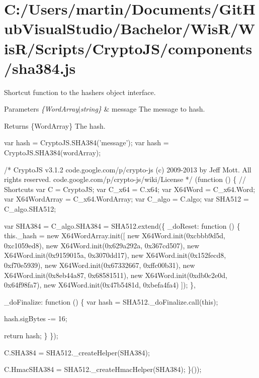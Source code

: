 \hypertarget{_c_1_2_users_2martin_2_documents_2_git_hub_visual_studio_2_bachelor_2_wis_r_2_wis_r_2_scripts_2_4702e0369f887b57f6c243281e391e4a}{}\section{C\+:/\+Users/martin/\+Documents/\+Git\+Hub\+Visual\+Studio/\+Bachelor/\+Wis\+R/\+Wis\+R/\+Scripts/\+Crypto\+J\+S/components/sha384.\+js}
Shortcut function to the hasher\textquotesingle{}s object interface.


\begin{DoxyParams}{Parameters}
{\em \{\+Word\+Array$\vert$string\}} & message The message to hash.\\
\hline
\end{DoxyParams}
\begin{DoxyReturn}{Returns}
\{Word\+Array\} The hash.
\end{DoxyReturn}
\begin{DoxyVerb}var hash = CryptoJS.SHA384('message');
var hash = CryptoJS.SHA384(wordArray);\end{DoxyVerb}



\begin{DoxyCodeInclude}
\textcolor{comment}{/*}
\textcolor{comment}{CryptoJS v3.1.2}
\textcolor{comment}{code.google.com/p/crypto-js}
\textcolor{comment}{(c) 2009-2013 by Jeff Mott. All rights reserved.}
\textcolor{comment}{code.google.com/p/crypto-js/wiki/License}
\textcolor{comment}{*/}
(\textcolor{keyword}{function} () \{
    \textcolor{comment}{// Shortcuts}
    var C = CryptoJS;
    var C\_x64 = C.x64;
    var X64Word = C\_x64.Word;
    var X64WordArray = C\_x64.WordArray;
    var C\_algo = C.algo;
    var SHA512 = C\_algo.SHA512;

    var SHA384 = C\_algo.SHA384 = SHA512.extend(\{
        \_doReset: \textcolor{keyword}{function} () \{
            this.\_hash = \textcolor{keyword}{new} X64WordArray.init([
                \textcolor{keyword}{new} X64Word.init(0xcbbb9d5d, 0xc1059ed8), \textcolor{keyword}{new} X64Word.init(0x629a292a, 0x367cd507),
                \textcolor{keyword}{new} X64Word.init(0x9159015a, 0x3070dd17), \textcolor{keyword}{new} X64Word.init(0x152fecd8, 0xf70e5939),
                \textcolor{keyword}{new} X64Word.init(0x67332667, 0xffc00b31), \textcolor{keyword}{new} X64Word.init(0x8eb44a87, 0x68581511),
                \textcolor{keyword}{new} X64Word.init(0xdb0c2e0d, 0x64f98fa7), \textcolor{keyword}{new} X64Word.init(0x47b5481d, 0xbefa4fa4)
            ]);
        \},

        \_doFinalize: \textcolor{keyword}{function} () \{
            var hash = SHA512.\_doFinalize.call(\textcolor{keyword}{this});

            hash.sigBytes -= 16;

            \textcolor{keywordflow}{return} hash;
        \}
    \});

    C.SHA384 = SHA512.\_createHelper(SHA384);

    C.HmacSHA384 = SHA512.\_createHmacHelper(SHA384);
\}());
\end{DoxyCodeInclude}
 
